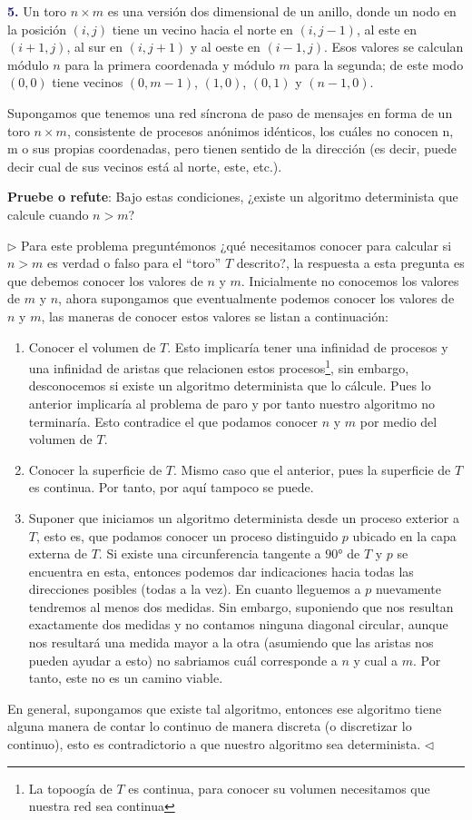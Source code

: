 
\textbf{\textcolor{MidnightBlue}{5.}} Un toro $n \times m$ es una versión
dos dimensional de un anillo, donde un nodo en la posición $(i, j)$ tiene
un vecino hacia el norte en $(i, j - 1)$, al este en $(i + 1, j)$, al sur
en $(i, j + 1)$ y al oeste en $(i - 1, j)$. Esos valores se calculan módulo
$n$ para la primera coordenada y módulo $m$ para la segunda; de este modo
$(0, 0)$ tiene vecinos $(0, m - 1)$, $(1, 0)$, $(0, 1)$ y $(n - 1, 0)$.

Supongamos que tenemos una red síncrona de paso de mensajes en forma de un
toro $n \times m$, consistente de procesos anónimos idénticos, los cuáles
no conocen n, m o sus propias coordenadas, pero tienen sentido de la dirección
(es decir, puede decir cual de sus vecinos está al norte, este, etc.).

\textbf{Pruebe o refute}: Bajo estas condiciones, ¿existe un algoritmo
determinista que calcule cuando $n > m$? \newline

$\rhd$ Para este problema preguntémonos ¿qué necesitamos conocer para calcular
si $n > m$ es verdad o falso para el ``toro'' $T$ descrito?, la respuesta a esta
pregunta es que debemos conocer los valores de $n$ y $m$. Inicialmente no conocemos
los valores de $m$ y $n$, ahora supongamos que eventualmente podemos conocer los
valores de $n$ y $m$, las maneras de conocer estos valores se listan a continuación:
\begin{enumerate}
        \item Conocer el volumen de $T$. Esto implicaría tener una infinidad de procesos
        y una infinidad de aristas que relacionen estos procesos\footnote{La topoogía de
        $T$ es continua, para conocer su volumen necesitamos que nuestra red sea continua},
        sin embargo, desconocemos si existe un algoritmo determinista que lo cálcule. Pues
        lo anterior implicaría al problema de paro y por tanto nuestro algoritmo no terminaría.
        Esto contradice el que podamos conocer $n$ y $m$ por medio del volumen de $T$.
        
        \item Conocer la superficie de $T$. Mismo caso que el anterior, pues la superficie
        de $T$ es continua. Por tanto, por aquí tampoco se puede.
        
        \item Suponer que iniciamos un algoritmo determinista desde un proceso exterior
        a $T$, esto es, que podamos conocer un proceso distinguido $p$ ubicado en la capa
        externa de $T$. Si existe una circunferencia tangente a $90°$ de $T$ y $p$ se
        encuentra en esta, entonces podemos dar indicaciones hacia todas las direcciones
        posibles (todas a la vez). En cuanto lleguemos a $p$ nuevamente tendremos al menos
        dos medidas. Sin embargo, suponiendo que nos resultan exactamente dos medidas y no
        contamos ninguna diagonal circular, aunque nos resultará una medida mayor a la otra
        (asumiendo que las aristas nos pueden ayudar a esto) no sabriamos cuál corresponde
        a $n$ y cual a $m$. Por tanto, este no es un camino viable.
\end{enumerate}

En general, supongamos que existe tal algoritmo, entonces ese algoritmo tiene alguna manera
de contar lo continuo de manera discreta (o discretizar lo continuo), esto es contradictorio
a que nuestro algoritmo sea determinista.
\hfill $\lhd$
